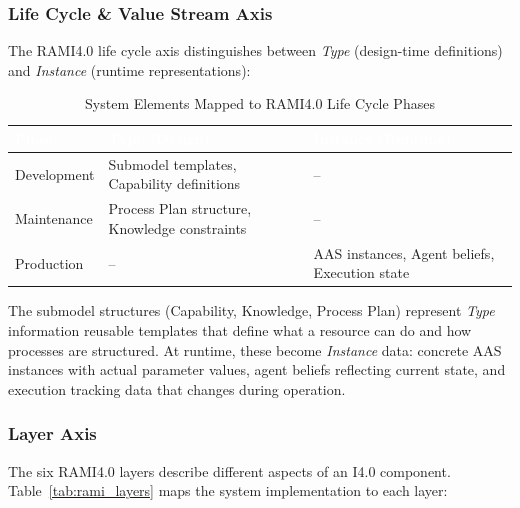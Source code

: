 \subsubsection{Life Cycle \& Value Stream Axis}

The RAMI4.0 life cycle axis distinguishes between \textit{Type} (design-time definitions) and \textit{Instance} (runtime representations):

\begin{table}[ht]
\centering
\caption{System Elements Mapped to RAMI4.0 Life Cycle Phases}
\label{tab:rami_lifecycle}
\begin{tabular}{p{}p{}p{}}
\toprule
\rowcolor{headerblue}
\textcolor{white}{Phase} & \textcolor{white}{Type (Design)} & \textcolor{white}{Instance (Runtime)} \\
\midrule
Development & Submodel templates, Capability definitions & -- \\
\rowcolor{lightgray}
Maintenance & Process Plan structure, Knowledge constraints & -- \\
Production & -- & AAS instances, Agent beliefs, Execution state \\
\bottomrule
\end{tabular}
\end{table}

The submodel structures (Capability, Knowledge, Process Plan) represent \textit{Type} information reusable templates that define what a resource can do and how processes are structured. At runtime, these become \textit{Instance} data: concrete AAS instances with actual parameter values, agent beliefs reflecting current state, and execution tracking data that changes during operation.

\subsubsection{Layer Axis}

The six RAMI4.0 layers describe different aspects of an \ac{I4.0} component. Table~\ref{tab:rami_layers} maps the system implementation to each layer:

